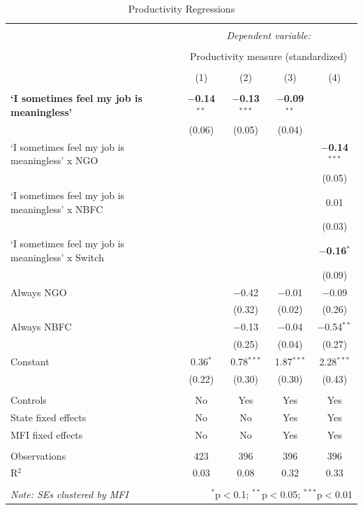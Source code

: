 \documentclass[12pt]{article}
\begin{document}
\begin{table}[!htbp] \centering 
  \caption{Productivity Regressions} 
  \label{} 
\footnotesize 
\begin{tabular}{@{\extracolsep{5pt}}lcccc} 
\\[-1.8ex]\hline 
\hline \\[-1.8ex] 
 & \multicolumn{4}{c}{\textit{Dependent variable:}} \\ 
\cline{2-5} 
\\[-1.8ex] & \multicolumn{4}{c}{Productivity measure (standardized)} \\ 
\\[-1.8ex] & (1) & (2) & (3) & (4)\\ 
\hline \\[-1.8ex] 
 \textbf{`I sometimes feel my job is meaningless'} & \textbf{$-$0.14$^{**}$} & \textbf{$-$0.13$^{***}$} & \textbf{$-$0.09$^{**}$} &  \\ 
  & (0.06) & (0.05) & (0.04) &  \\ 
  `I sometimes feel my job is meaningless' x NGO &  &  &  & \textbf{$-$0.14$^{***}$} \\ 
  &  &  &  & (0.05) \\ 
  `I sometimes feel my job is meaningless' x NBFC &  &  &  & 0.01 \\ 
  &  &  &  & (0.03) \\ 
  `I sometimes feel my job is meaningless' x Switch &  &  &  & \textbf{$-$0.16$^{*}$} \\ 
  &  &  &  & (0.09) \\ 
  Always NGO &  & $-$0.42 & $-$0.01 & $-$0.09 \\ 
  &  & (0.32) & (0.02) & (0.26) \\ 
  Always NBFC &  & $-$0.13 & $-$0.04 & $-$0.54$^{**}$ \\ 
  &  & (0.25) & (0.04) & (0.27) \\ 
  Constant & 0.36$^{*}$ & 0.78$^{***}$ & 1.87$^{***}$ & 2.28$^{***}$ \\ 
  & (0.22) & (0.30) & (0.30) & (0.43) \\ 
 \hline \\[-1.8ex] 
Controls & No & Yes & Yes & Yes \\ 
State fixed effects & No & No & Yes & Yes \\ 
MFI fixed effects & No & No & Yes & Yes \\ 
\hline \\[-1.8ex] 
Observations & 423 & 396 & 396 & 396 \\ 
R$^{2}$ & 0.03 & 0.08 & 0.32 & 0.33 \\ 
\hline 
\hline \\[-1.8ex] 
\textit{Note: SEs clustered by MFI}  & \multicolumn{4}{r}{$^{*}$p$<$0.1; $^{**}$p$<$0.05; $^{***}$p$<$0.01} \\ 
\end{tabular} 
\end{table} 
\end{document}
